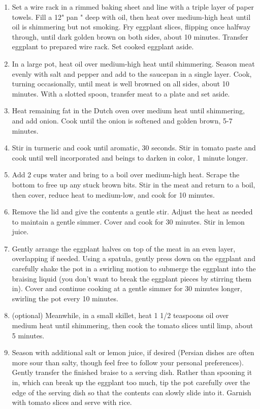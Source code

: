 \begin{enumerate}
    \item Set a wire rack in a rimmed baking sheet and line with a triple layer of paper towels. Fill a 12" pan " deep with oil, then heat over medium-high heat until oil is shimmering but not smoking. Fry eggplant slices, flipping once halfway through, until dark golden brown on both sides, about 10 minutes. Transfer eggplant to prepared wire rack. Set cooked eggplant aside.
    \item In a large pot, heat oil over medium-high heat until shimmering. Season meat evenly with salt and pepper and add to the saucepan in a single layer. Cook, turning occasionally, until meat is well browned on all sides, about 10 minutes. With a slotted spoon, transfer meat to a plate and set aside.
    \item Heat remaining fat in the Dutch oven over medium heat until shimmering, and add onion. Cook until the onion is softened and golden brown, 5-7 minutes.
    \item Stir in turmeric and cook until aromatic, 30 seconds. Stir in tomato paste and cook until well incorporated and beings to darken in color, 1 minute longer.
    \item Add 2 cups water and bring to a boil over medium-high heat. Scrape the bottom to free up any stuck brown bits. Stir in the meat and return to a boil, then cover, reduce heat to medium-low, and cook for 10 minutes.
    \item Remove the lid and give the contents a gentle stir. Adjust the heat as needed to maintain a gentle simmer. Cover and cook for 30 minutes. Stir in lemon juice.
    \item Gently arrange the eggplant halves on top of the meat in an even layer, overlapping if needed. Using a spatula, gently press down on the eggplant and carefully shake the pot in a swirling motion to submerge the eggplant into the braising liquid (you don't want to break the eggplant pieces by stirring them in). Cover and continue cooking at a gentle simmer for 30 minutes longer, swirling the pot every 10 minutes.
    \item (optional) Meanwhile, in a small skillet, heat 1 1/2 teaspoons oil over medium heat until shimmering, then cook the tomato slices until limp, about 5 minutes.
    \item Season with additional salt or lemon juice, if desired (Persian dishes are often more sour than salty, though feel free to follow your personal preferences). Gently transfer the finished braise to a serving dish. Rather than spooning it in, which can break up the eggplant too much, tip the pot carefully over the edge of the serving dish so that the contents can slowly slide into it. Garnish with tomato slices and serve with rice.
\end{enumerate}
